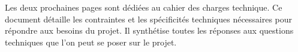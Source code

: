 Les deux prochaines pages sont dédiées au cahier des charges technique.
Ce document détaille les contraintes et les spécificités techniques nécessaires pour répondre aux besoins du projet.
Il synthétise toutes les réponses aux questions techniques que l'on peut se poser sur le projet.
\\



